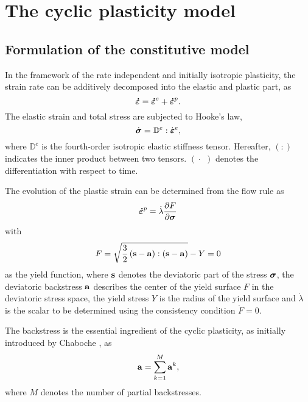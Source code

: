 \documentclass[preprint,5p,twocolumn,11pt,sort&compress]{elsarticle}
\newcommand{\bfsigma}{{\mbox{\boldmath{$\sigma$}}}}
\newcommand{\bfepsilon}{{\mbox{\boldmath{$\varepsilon$}}}}
\newcommand{\dotbfepsilon}{{\mbox{\boldmath{$\dot\varepsilon$}}}}
\newcommand{\bfa}{{\bf a}}
\newcommand{\bfs}{{\bf s}}
\begin{document}
\section{The cyclic plasticity model}

\subsection{Formulation of the constitutive model}
\noindent
In the framework of the rate independent and initially isotropic plasticity, the strain rate can be additively decomposed into the elastic and plastic  part, as
\begin{equation}
\dotbfepsilon = {\dotbfepsilon}^e + {\dotbfepsilon}^p.
\end{equation}
The elastic strain and total stress are subjected to Hooke's law,
\begin{equation}
{\dot\bfsigma} = {\mathbb{D}^e}:{\dot\bfepsilon^e},
\label{Equ:HookesLaw}
\end{equation}
where ${\mathbb{D}^e}$ is the fourth-order isotropic elastic stiffness tensor. Hereafter, $(:)$ indicates the inner product between two tensors. $(\dot{\quad})$ denotes the differentiation with respect to time.

The evolution of the plastic strain can be determined from the flow rule as
\begin{equation}
{\dotbfepsilon}^p = \dot \lambda \frac{{\partial F}}{{\partial {\bfsigma}}}
\end{equation}
with
\begin{equation}
F = \sqrt {\frac{3}{2}\left( {\bfs - \bfa} \right):\left( {\bfs - \bfa} \right)}  - Y=0
\end{equation}
as the yield function, where $\bfs$ denotes the deviatoric part of the stress ${\bfsigma}$, the deviatoric backstress $\bfa$ describes the center of the yield surface $F$ in the deviatoric stress space, the yield stress $Y$ is the radius of the yield surface and $\dot \lambda$ is the scalar to be determined using the consistency condition $\dot F = 0$.

The backstress is the essential ingredient of the cyclic plasticity, as initially introduced by Chaboche \cite{Chaboche1986149}, as
\begin{equation}
\bfa = \sum\limits_{k = 1}^M {{\bfa^k}},
\end{equation}
where $M$ denotes the number of partial backstresses.
\end{document}
